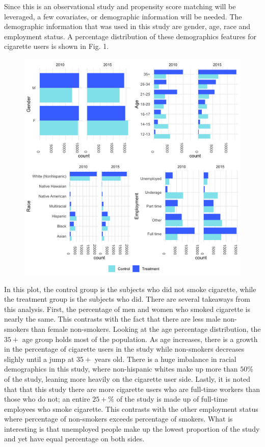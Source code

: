 \documentclass[a4paper, 10pt, conference]{ieeeconf}
\begin{document}
Since this is an observational study and propensity score matching will be leveraged, a few covariates, or demographic information will be needed. The demographic information that was used in this study are gender, age, race and employment status. A percentage distribution of these demographics features for cigarette users is shown in Fig. 1. 
\begin{figure} \includegraphics[scale = 0.11]{CigaretteDemographics}  \end{figure} 
\parindent 10pt In this plot, the control group is the subjects who did not smoke cigarette, while the treatment group is the subjects who did. There are several takeaways from this analysis. 
First, the percentage of men and women who smoked cigarette is nearly the same. This contrasts with the fact that there are less male non-smokers than female non-smokers. Looking at the age percentage distribution, the $35+$ age group holds most of the population. As age increases, there is a growth in the percentage of cigarette users in the study while non-smokers decreases slighly until a jump at $35+$ years old. There is a huge imbalance in racial demographics in this study, where non-hispanic whites make up more than $50\%$ of the study, leaning more heavily on the cigarette user side. Lastly, it is noted that that this study there are more cigarette users who are full-time workers than those who do not; an entire $25+\%$ of the study is made up of full-time employees who smoke cigarette. This contrasts with the other employment status where percentage of non-smokers exceeds percentage of smokers. What is interesting is that unemployed people make up the lowest proportion of the study and yet have equal percentage on both sides. 
\end{document}

